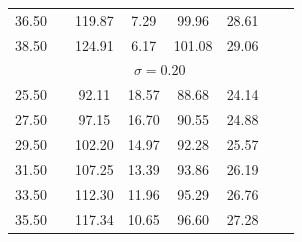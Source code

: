 \documentclass{article}
\begin{document}
\begin{appendices}
\begin{table}[h]
{\begin{tabularx}{\linewidth}{cXcccccr}
         36.50    &&    119.87     &     7.29&         99.96    &     28.61 \\
         38.50    &&    124.91     &     6.17&        101.08&         29.06 \\
		\hline 
		&\multicolumn{5}{c}{$\sigma=0.20$} \\
		\hline 
         25.50  &&       92.11   &      18.57  &       88.68 &        24.14\\
         27.50  &&       97.15   &      16.70  &       90.55 &        24.88\\
         29.50  &&      102.20   &      14.97  &       92.28 &        25.57\\
         31.50  &&      107.25   &      13.39  &       93.86 &        26.19\\
         33.50  &&      112.30   &      11.96  &       95.29 &        26.76\\
         35.50  &&      117.34   &      10.65  &       96.60 &        27.28\\

\end{tabularx}}
\end{table}
\end{appendices}
\end{document}
